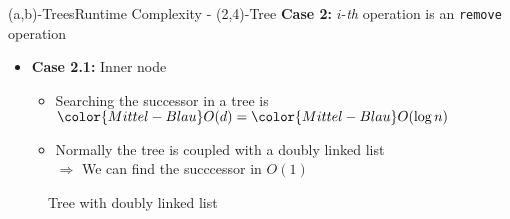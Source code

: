 \begin{frame}{(a,b)-Trees}{Runtime Complexity - (2,4)-Tree}
  \textbf{Case 2:}
  {\color{Mittel-Blau}$i$}-\textit{th} operation is an
  \texttt{\color{Mittel-Blau}remove} operation
  \begin{itemize}
    \item<2->
      \textbf{Case 2.1:} Inner node
      \begin{itemize}
        \item<3->
         Searching the successor in a tree is
          \begin{math}
           {\color{Mittel-Blau}O(d)} =
           {\color{Mittel-Blau}O(\log n)}
          \end{math}
        \item<4->
          Normally the tree is coupled with a doubly linked list\\
          $\Rightarrow$ We can find the succcessor in
          {\color{Mittel-Blau}$O(1)$}
    \end{itemize}
  \end{itemize}
  \vspace{0.5em}
  \begin{figure}
    \begin{adjustbox}{width=0.75\linewidth}
      
    \end{adjustbox}
    \caption{Tree with doubly linked list}
    \label{fig:a_b_tree:doubly_linked_list}
  \end{figure}
\end{frame}


